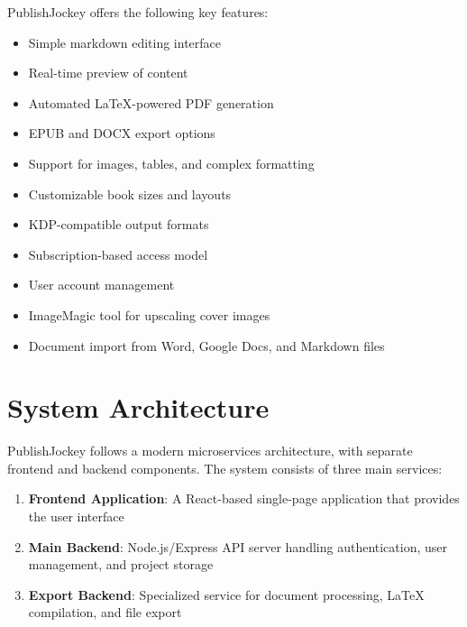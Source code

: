 \documentclass[12pt,a4paper]{book}
\begin{document}
PublishJockey offers the following key features:

\begin{itemize}
  \item Simple markdown editing interface
  \item Real-time preview of content
  \item Automated LaTeX-powered PDF generation
  \item EPUB and DOCX export options
  \item Support for images, tables, and complex formatting
  \item Customizable book sizes and layouts
  \item KDP-compatible output formats
  \item Subscription-based access model
  \item User account management
  \item ImageMagic tool for upscaling cover images
  \item Document import from Word, Google Docs, and Markdown files
\end{itemize}

\section{System Architecture}

PublishJockey follows a modern microservices architecture, with separate frontend and backend components. The system consists of three main services:

\begin{enumerate}
  \item \textbf{Frontend Application}: A React-based single-page application that provides the user interface
  \item \textbf{Main Backend}: Node.js/Express API server handling authentication, user management, and project storage
  \item \textbf{Export Backend}: Specialized service for document processing, LaTeX compilation, and file export
\end{enumerate}
\end{document}
